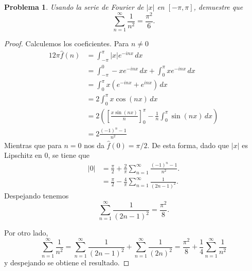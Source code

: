 \documentclass{article}
\theoremstyle{plain}
\newtheorem{Problema}{Problema}
\theoremstyle{definition}
\newcommand{\abs}[1]{\lvert #1 \rvert}
\begin{document}
\begin{Problema}
  Usando la serie de Fourier de \(\abs{x}\) en \([-\pi, \pi]\), demuestre que
  \begin{displaymath}
    \sum_{n=1}^{\infty} \frac{1}{n^2}
    =
    \frac{\pi^2}{6}.
  \end{displaymath}
\end{Problema}
\begin{proof}
  Calculemos los coeficientes. Para \(n\ne 0\) 
  \begin{alignat*}{1}
    2\pi \hat f(n) 
    &= \int_{-\pi}^{\pi} \abs{x} e^{-inx} \, dx
    \\&= \int_{-\pi}^{0} -x e^{-inx} \, dx
      + \int_{0}^{\pi} x e^{-inx} \, dx
    \\&= \int_{0}^{\pi} x (e^{-inx} + e^{inx}) \, dx
    \\&= 2 \int_{0}^{\pi} x\cos(nx) \, dx
    \\&= 2 \left(
      \left[ \frac{x \sin(nx)}{n} \right]_0^{\pi}
      -
      \frac{1}{n} \int_{0}^{\pi} \sin(nx)\, dx
    \right) 
    \\&=
    2 \frac{(-1)^{n} - 1}{n^2}
  \end{alignat*}
  Mientras que para \(n=0\) nos da \(\hat f(0) = \pi/2\). De esta forma, dado que \(\abs{x}\) es
  Lipschitz en \(0\), se tiene que 
  \begin{align*}
    \abs{0} 
    &= \frac{\pi}{2} + \frac{2}{\pi} \sum_{n=1}^{\infty} \frac{(-1)^n - 1}{n^2}.
    \\&= \frac{\pi}{2} - \frac{4}{\pi} \sum_{n=1}^{\infty} \frac{1}{(2n-1)^2}.
  \end{align*}
  Despejando tenemos 
  \begin{displaymath}
    \sum_{n=1}^{\infty} \frac{1}{(2n-1)^2}
    =
    \frac{\pi^2}{8}.
  \end{displaymath}

  Por otro lado,
  \begin{displaymath}
    \sum_{n=1}^{\infty} 
      \frac{1}{n^2}
    =
    \sum_{n=1}^{\infty} 
      \frac{1}{(2n-1)^2}
    +
    \sum_{n=1}^{\infty} 
      \frac{1}{(2n)^2}
    =
    \frac{\pi^2}{8}
    +
    \frac{1}{4}
    \sum_{n=1}^{\infty} 
      \frac{1}{n^2}
  \end{displaymath}
  y despejando se obtiene el resultado.
\end{proof}
\end{document}
